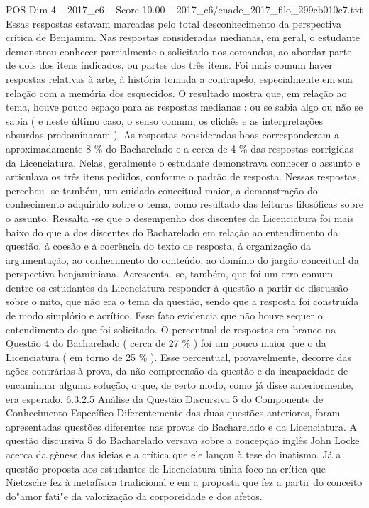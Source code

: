 \begin{textsample}{POS Dim 4 – 2017\_c6 – Score 10.00 – 2017\_c6/enade\_2017\_filo\_299cb010c7.txt}
Essas respostas estavam marcadas pelo total desconhecimento da perspectiva crítica de Benjamim.
Nas respostas consideradas medianas, em geral, o estudante demonstrou conhecer parcialmente o solicitado nos comandos, ao abordar parte de dois dos itens indicados, ou partes dos três itens.
Foi mais comum haver respostas relativas à arte, à história tomada a contrapelo, especialmente em sua relação com a memória dos esquecidos.
O resultado mostra que, em relação ao tema, houve pouco espaço para as respostas medianas : ou se sabia algo ou não se sabia ( e neste último caso, o senso comum, os clichês e as interpretações absurdas predominaram ).
As respostas consideradas boas corresponderam a aproximadamente 8 \% do Bacharelado e a cerca de 4 \% das respostas corrigidas da Licenciatura.
Nelas, geralmente o estudante demonstrava conhecer o assunto e articulava os três itens pedidos, conforme o padrão de resposta.
Nessas respostas, percebeu -se também, um cuidado conceitual maior, a demonstração do conhecimento adquirido sobre o tema, como resultado das leituras filosóficas sobre o assunto.
Ressalta -se que o desempenho dos discentes da Licenciatura foi mais baixo do que a dos discentes do Bacharelado em relação ao entendimento da questão, à coesão e à coerência do texto de resposta, à organização da argumentação, ao conhecimento do conteúdo, ao domínio do jargão conceitual da perspectiva benjaminiana.
Acrescenta -se, também, que foi um erro comum dentre os estudantes da Licenciatura responder à questão a partir de discussão sobre o mito, que não era o tema da questão, sendo que a resposta foi construída de modo simplório e acrítico.
Esse fato evidencia que não houve sequer o entendimento do que foi solicitado.
O percentual de respostas em branco na Questão 4 do Bacharelado ( cerca de 27 \% ) foi um pouco maior que o da Licenciatura ( em torno de 25 \% ).
Esse percentual, provavelmente, decorre das ações contrárias à prova, da não compreensão da questão e da incapacidade de encaminhar alguma solução, o que, de certo modo, como já disse anteriormente, era esperado. 6.3.2.5 Análise da Questão Discursiva 5 do Componente de Conhecimento Específico Diferentemente das duas questões anteriores, foram apresentadas questões diferentes nas provas do Bacharelado e da Licenciatura.
A questão discursiva 5 do Bacharelado versava sobre a concepção inglês John Locke acerca da gênese das ideias e a crítica que ele lançou à tese do inatismo.
Já a questão proposta aos estudantes de Licenciatura tinha foco na crítica que Nietzsche fez à metafísica tradicional e em a proposta que fez a partir do conceito do"amor fati"e da valorização da corporeidade e dos afetos.

\end{textsample}
